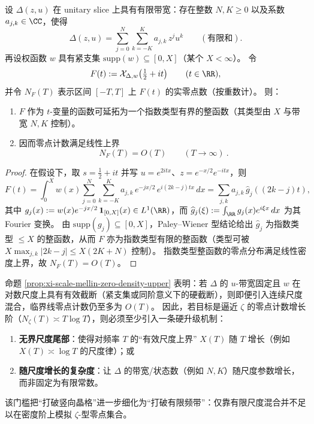 \begin{proposition}[有限频带/有限尺度的零点密度上界：\texorpdfstring{$N(T)=O(T)$}{N(T)=O(T)}]\label{prop:xi-scale-mellin-zero-density-upper}
设 \(\Delta(z,u)\) 在 unitary slice 上具有有限带宽：存在整数 \(N,K\ge 0\) 以及系数 \(a_{j,k}\in\CC\)，使得
\[
\Delta(z,u)=\sum_{j=0}^{N}\sum_{k=-K}^{K} a_{j,k}\,z^j u^k
\qquad(\text{有限和}).
\]
再设权函数 \(w\) 具有紧支集 \(\mathrm{supp}(w)\subseteq [0,X]\)（某个 \(X<\infty\)）。
令
\[
F(t):=\mathcal X_{\Delta,w}\!\left(\tfrac12+it\right)\qquad(t\in\RR),
\]
并令 \(N_F(T)\) 表示区间 \([-T,T]\) 上 \(F(t)\) 的实零点数（按重数计）。
则：
\begin{enumerate}
  \item \(F\) 作为 \(t\)-变量的函数可延拓为一个指数类型有界的整函数（其类型由 \(X\) 与带宽 \(N,K\) 控制）。
  \item 因而零点计数满足线性上界
  \[
  \boxed{\ N_F(T)=O(T)\qquad(T\to\infty)\ }.
  \]
\end{enumerate}
\end{proposition}
\begin{proof}
在假设下，取 \(s=\tfrac12+it\) 并写 \(u=e^{2itx}\)、\(z=e^{-x/2}e^{-itx}\)，则
\[
F(t)=\int_0^X w(x)\sum_{j=0}^{N}\sum_{k=-K}^{K} a_{j,k}\,e^{-jx/2}\,e^{i(2k-j)tx}\,dx
=\sum_{j,k}a_{j,k}\,\widehat g_{j}( (2k-j)t),
\]
其中 \(g_j(x):=w(x)e^{-jx/2}\,\mathbf{1}_{[0,X]}(x)\in L^1(\RR)\)，而 \(\widehat g_j(\xi):=\int_{\RR} g_j(x)e^{i\xi x}\,dx\) 为其 Fourier 变换。
由 \(\mathrm{supp}(g_j)\subseteq[0,X]\)，Paley--Wiener 型结论给出 \(\widehat g_j\) 为指数类型 \(\le X\) 的整函数，从而 \(F\) 亦为指数类型有限的整函数（类型可被 \(X\max_{j,k}|2k-j|\le X(2K+N)\) 控制）。
指数类型整函数的零点分布满足线性密度上界，故 \(N_F(T)=O(T)\)。
\end{proof}



\begin{remark}\label{rem:xi-scale-mellin-density-threshold}
命题 \ref{prop:xi-scale-mellin-zero-density-upper} 表明：若 \(\Delta\) 的 \(u\)-带宽固定且 \(w\) 在对数尺度上具有有效截断（紧支集或同阶意义下的硬截断），则即便引入连续尺度混合，临界线零点计数仍至多为 \(O(T)\)。
因此，若目标是逼近 \(\zeta\) 的零点计数增长阶（\(N_\zeta(T)\asymp T\log T\)），则必须至少引入一条硬升级机制：
\begin{enumerate}
  \item \textbf{无界尺度尾部}：使得对频率 \(T\) 的“有效尺度上界” \(X(T)\) 随 \(T\) 增长（例如 \(X(T)\asymp \log T\) 的尺度律）；或
  \item \textbf{随尺度增长的复杂度}：让 \(\Delta\) 的带宽/状态数（例如 \(N,K\)）随尺度参数增长，而非固定为有限常数。
\end{enumerate}
该门槛把“打破竖向晶格”进一步细化为“打破有限频带”：仅靠有限尺度混合并不足以在密度阶上模拟 \(\zeta\)-型零点集合。
\end{remark}

